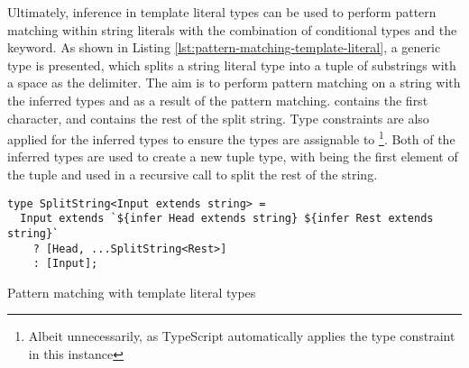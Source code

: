 Ultimately, inference in template literal types can be used to perform pattern matching within string literals with the combination of conditional types and the  keyword. As shown in Listing \ref{lst:pattern-matching-template-literal}, a generic type  is presented, which splits a string literal type into a tuple of substrings with a space as the delimiter. The aim is to perform pattern matching on a string with the inferred types  and  as a result of the pattern matching.  contains the first character, and  contains the rest of the split string. Type constraints are also applied for the inferred types to ensure the types are assignable to \footnote{Albeit unnecessarily, as TypeScript automatically applies the  type constraint in this instance}. Both of the inferred types are used to create a new tuple type, with  being the first element of the tuple and  used in a recursive call to split the rest of the string.

\begin{listing}[ht]
  \begin{verbatim}
type SplitString<Input extends string> = 
  Input extends `${infer Head extends string} ${infer Rest extends string}`
    ? [Head, ...SplitString<Rest>]
    : [Input];
\end{verbatim}
  \caption{Pattern matching with template literal types}\label{lst:pattern-matching-template-literal}
\end{listing}
